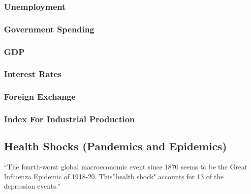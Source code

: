 \documentclass[]{book}
\begin{document}
\hypertarget{unemployment}{%
\subsubsection{Unemployment}\label{unemployment}}

\citep{wright2012unemployment}

\hypertarget{government-spending}{%
\subsubsection{Government Spending}\label{government-spending}}

\hypertarget{gdp}{%
\subsubsection{GDP}\label{gdp}}

\hypertarget{interest-rates}{%
\subsubsection{Interest Rates}\label{interest-rates}}

\citep{chauvet2005forecasting}

\hypertarget{foreign-exchange}{%
\subsubsection{Foreign Exchange}\label{foreign-exchange}}

\hypertarget{index-for-industrial-production}{%
\subsubsection{Index For Industrial Production}\label{index-for-industrial-production}}

\hypertarget{health-shocks-pandemics-and-epidemics}{%
\subsection{Health Shocks (Pandemics and Epidemics)}\label{health-shocks-pandemics-and-epidemics}}

``The fourth-worst global macroeconomic event since 1870 seems to be the Great Influenza Epidemic of 1918-20. This''health shock" accounts for 13 of the depression events." \citep{barro2009pandemics}
\end{document}
